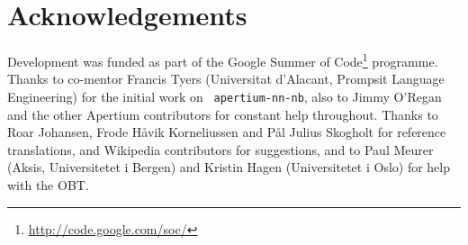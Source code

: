 \documentclass[11pt]{article}
\begin{document}
\section*{Acknowledgements}
Development was funded as part of the Google Summer of
Code\footnote{\href{http://code.google.com/soc/}{http://code.google.com/soc/}
} programme. Thanks to co-mentor Francis Tyers (Universitat d'Alacant,
Prompsit Language Engineering) for the initial work on {\tt \small 
  apertium-nn-nb}, also to Jimmy O'Regan and the other Apertium
contributors for constant help throughout. Thanks to Roar Johansen,
Frode Håvik Korneliussen and Pål Julius Skogholt for reference
translations, and Wikipedia contributors for suggestions, and to Paul
Meurer (Aksis, Universitetet i Bergen) and Kristin Hagen
(Universitetet i Oslo) for help with the OBT.




\end{document}
